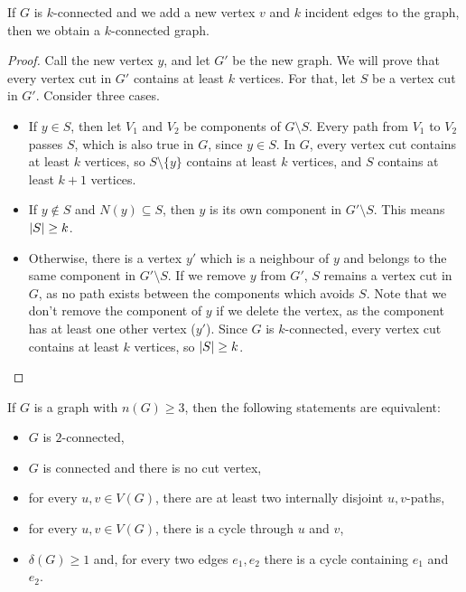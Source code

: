 
\begin{theorem}
  If $G$ is $k$-connected and we add a new vertex $v$ and $k$ incident edges to
  the graph, then we obtain a $k$-connected graph.
\end{theorem}

\begin{proof}
  Call the new vertex $y$, and let $G'$ be the new graph.
  We will prove that every vertex cut in $G'$ contains at least $k$ vertices.
  For that, let $S$ be a vertex cut in $G'$.
  Consider three cases.
  \begin{itemize}
  \item If $y \in S$, then let $V_1$ and $V_2$ be components of $G \setminus S$.
	Every path from $V_1$ to $V_2$ passes $S$, which is also true in $G$, since
	$y \in S$.
	In $G$, every vertex cut contains at least $k$ vertices, so $S \setminus
	\{y\}$ contains at least $k$ vertices, and $S$ contains at least $k+1$
	vertices.

  \item If $y \notin S$ and $N(y) \subseteq S$, then $y$ is its own component in
	$G' \setminus S$.
	This means $\left| S \right| \ge k$.

  \item Otherwise, there is a vertex $y'$ which is a neighbour of $y$ and
	belongs to the same component in $G' \setminus S$.
	If we remove $y$ from $G'$, $S$ remains a vertex cut in $G$, as no path
	exists between the components which avoids $S$.
	Note that we don't remove the component of $y$ if we delete the vertex, as
	the component has at least one other vertex ($y'$).
	Since $G$ is $k$-connected, every vertex cut contains at least $k$ vertices,
	so $\left| S \right| \ge k$.
	\qedhere
  \end{itemize}
\end{proof}


\begin{theorem}
  If $G$ is a graph with $n(G) \ge 3$, then the following statements are
  equivalent:
  \begin{itemize}
  \item $G$ is $2$-connected,
  \item $G$ is connected and there is no cut vertex,
  \item for every $u,v \in V(G)$, there are at least two internally disjoint
	$u,v$-paths,
  \item for every $u,v \in V(G)$, there is a cycle through $u$ and $v$,
  \item $\delta(G) \ge 1$ and, for every two edges $e_1, e_2$ there is a cycle
	containing $e_1$ and $e_2$.
  \end{itemize}
\end{theorem}

